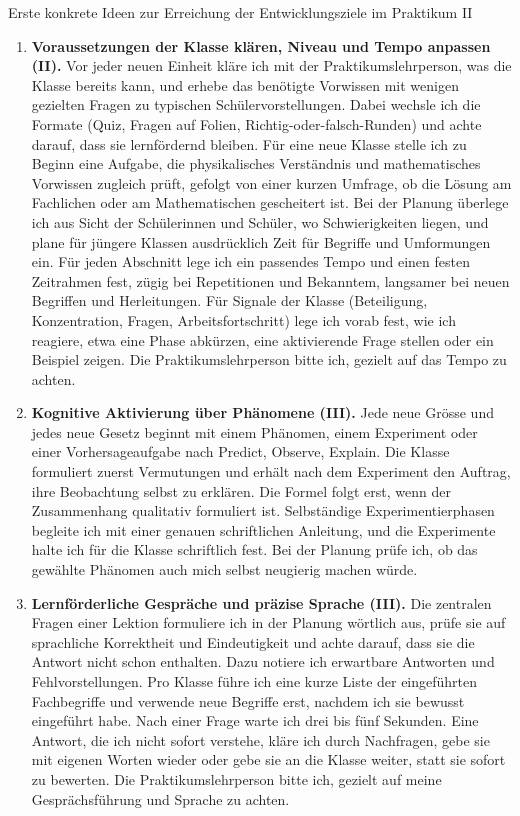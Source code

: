 \documentclass[12pt,a4paper]{article}
\begin{document}
\begin{Formularfeld}{Erste konkrete Ideen zur Erreichung der
Entwicklungsziele im Praktikum II}{}

\begin{enumerate}
  \item \textbf{Voraussetzungen der Klasse klären, Niveau und Tempo anpassen
  (II).} Vor jeder neuen Einheit kläre ich mit der Praktikumslehrperson, was
  die Klasse bereits kann, und erhebe das benötigte Vorwissen mit wenigen
  gezielten Fragen zu typischen Schülervorstellungen. Dabei wechsle ich die
  Formate (Quiz, Fragen auf Folien, Richtig-oder-falsch-Runden) und achte
  darauf, dass sie lernfördernd bleiben. Für eine neue Klasse stelle ich zu
  Beginn eine Aufgabe, die physikalisches Verständnis und mathematisches
  Vorwissen zugleich prüft, gefolgt von einer kurzen Umfrage, ob die Lösung am
  Fachlichen oder am Mathematischen gescheitert ist. Bei der Planung überlege
  ich aus Sicht der Schülerinnen und Schüler, wo Schwierigkeiten liegen, und
  plane für jüngere Klassen ausdrücklich Zeit für Begriffe und Umformungen
  ein. Für jeden Abschnitt lege ich ein passendes Tempo und einen festen
  Zeitrahmen fest, zügig bei Repetitionen und Bekanntem, langsamer bei neuen
  Begriffen und Herleitungen. Für Signale der Klasse (Beteiligung,
  Konzentration, Fragen, Arbeitsfortschritt) lege ich vorab fest, wie ich
  reagiere, etwa eine Phase abkürzen, eine aktivierende Frage stellen oder ein
  Beispiel zeigen. Die Praktikumslehrperson bitte ich, gezielt auf das Tempo
  zu achten.

  \item \textbf{Kognitive Aktivierung über Phänomene (III).} Jede neue Grösse
  und jedes neue Gesetz beginnt mit einem Phänomen, einem Experiment oder einer
  Vorhersageaufgabe nach Predict, Observe, Explain. Die Klasse formuliert
  zuerst Vermutungen und erhält nach dem Experiment den Auftrag, ihre
  Beobachtung selbst zu erklären. Die Formel folgt erst, wenn der Zusammenhang
  qualitativ formuliert ist. Selbständige Experimentierphasen begleite ich mit
  einer genauen schriftlichen Anleitung, und die Experimente halte ich für die
  Klasse schriftlich fest. Bei der Planung prüfe ich, ob das gewählte Phänomen
  auch mich selbst neugierig machen würde.

  \item \textbf{Lernförderliche Gespräche und präzise Sprache (III).} Die
  zentralen Fragen einer Lektion formuliere ich in der Planung wörtlich aus,
  prüfe sie auf sprachliche Korrektheit und Eindeutigkeit und achte darauf,
  dass sie die Antwort nicht schon enthalten. Dazu notiere ich erwartbare
  Antworten und Fehlvorstellungen. Pro Klasse führe ich eine kurze Liste der
  eingeführten Fachbegriffe und verwende neue Begriffe erst, nachdem ich sie
  bewusst eingeführt habe. Nach einer Frage warte ich drei bis fünf Sekunden.
  Eine Antwort, die ich nicht sofort verstehe, kläre ich durch Nachfragen, gebe
  sie mit eigenen Worten wieder oder gebe sie an die Klasse weiter, statt sie
  sofort zu bewerten. Die Praktikumslehrperson bitte ich, gezielt auf meine
  Gesprächsführung und Sprache zu achten.


\end{enumerate}
\end{Formularfeld}
\end{document}
